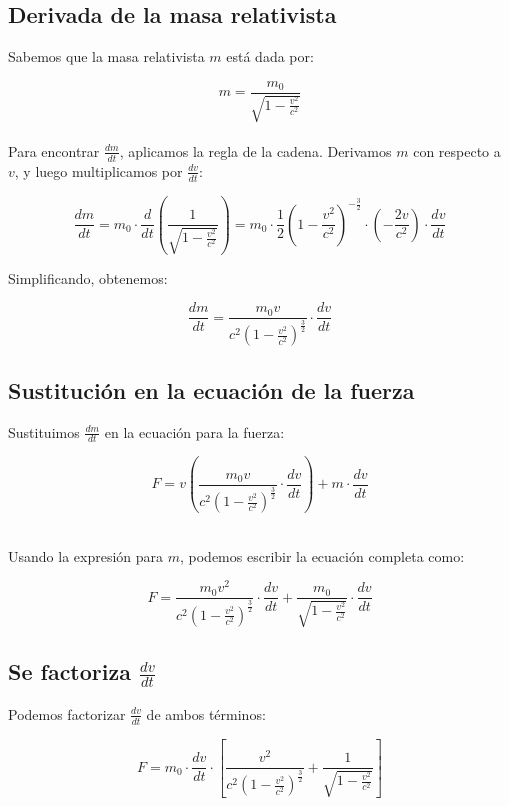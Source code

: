 \documentclass[11pt,letterpaper]{article}
\begin{document}
  \subsection*{Derivada de la masa relativista}
  
Sabemos que la masa relativista \( m \) está dada por:
  
  \[
      m = \frac{m_0}{\sqrt{1 - \frac{v^2}{c^2}}}
  \]
  \\Para encontrar \( \frac{dm}{dt} \), aplicamos la regla de la cadena. Derivamos \( m \) con respecto a \( v \), y luego multiplicamos por \( \frac{dv}{dt} \):
  
  \[
      \frac{dm}{dt} = m_0 \cdot \frac{d}{dt}\left(\frac{1}{\sqrt{1 - \frac{v^2}{c^2}}}\right) = m_0 \cdot \frac{1}{2}\left(1 - \frac{v^2}{c^2}\right)^{-\frac{3}{2}} \cdot \left(-\frac{2v}{c^2}\right) \cdot \frac{dv}{dt}
  \]
  
Simplificando, obtenemos:
  
  \begin{equation}
      \frac{dm}{dt} = \frac{m_0 v}{c^2 \left(1 - \frac{v^2}{c^2}\right)^{\frac{3}{2}}} \cdot \frac{dv}{dt}
  \end{equation}
  
  \subsection*{Sustitución en la ecuación de la fuerza}
  
  Sustituimos \( \frac{dm}{dt} \) en la ecuación para la fuerza:
  
  \[
      F = v \left(\frac{m_0 v}{c^2 \left(1 - \frac{v^2}{c^2}\right)^{\frac{3}{2}}} \cdot \frac{dv}{dt}\right) + m \cdot \frac{dv}{dt}
  \]
  
\\Usando la expresión para \( m \), podemos escribir la ecuación completa como:
  
  \[
      F = \frac{m_0 v^2}{c^2 \left(1 - \frac{v^2}{c^2}\right)^{\frac{3}{2}}} \cdot \frac{dv}{dt} + \frac{m_0}{\sqrt{1 - \frac{v^2}{c^2}}} \cdot \frac{dv}{dt}
  \]
  
  \subsection*{Se factoriza \( \frac{dv}{dt} \)}
  
  Podemos factorizar \( \frac{dv}{dt} \) de ambos términos:
  
  \[
      F = m_0 \cdot \frac{dv}{dt} \cdot \left[\frac{v^2}{c^2 \left(1 - \frac{v^2}{c^2}\right)^{\frac{3}{2}}} + \frac{1}{\sqrt{1 - \frac{v^2}{c^2}}}\right]
  \]
  
\end{document}
